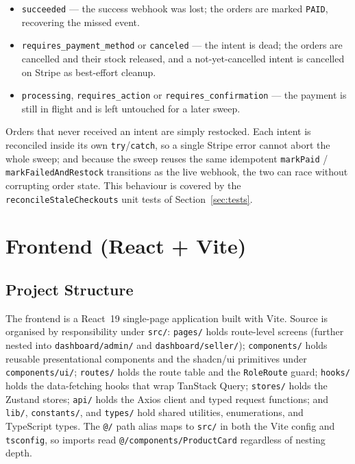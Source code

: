 \documentclass[12pt, a4paper, oneside]{report}
\begin{document}
\begin{itemize}[leftmargin=*,itemsep=2pt]
  \item \texttt{succeeded} --- the success webhook was lost; the orders
        are marked \texttt{PAID}, recovering the missed event.
  \item \texttt{requires\_payment\_method} or \texttt{canceled} --- the
        intent is dead; the orders are cancelled and their stock
        released, and a not-yet-cancelled intent is cancelled on Stripe
        as best-effort cleanup.
  \item \texttt{processing}, \texttt{requires\_action} or
        \texttt{requires\_confirmation} --- the payment is still in
        flight and is left untouched for a later sweep.
\end{itemize}

Orders that never received an intent are simply restocked. Each intent
is reconciled inside its own \texttt{try}/\texttt{catch}, so a single
Stripe error cannot abort the whole sweep; and because the sweep reuses
the same idempotent \texttt{markPaid} / \texttt{markFailedAndRestock}
transitions as the live webhook, the two can race without corrupting
order state. This behaviour is covered by the
\texttt{reconcileStaleCheckouts} unit tests of Section~\ref{sec:tests}.

\section{Frontend (React + Vite)}

\subsection{Project Structure}

The frontend is a React~19 single-page application built with Vite.
Source is organised by responsibility under \texttt{src/}:
\texttt{pages/} holds route-level screens (further nested into
\texttt{dashboard/admin/} and \texttt{dashboard/seller/});
\texttt{components/} holds reusable presentational components and the
shadcn/ui primitives under \texttt{components/ui/}; \texttt{routes/}
holds the route table and the \texttt{RoleRoute} guard;
\texttt{hooks/} holds the data-fetching hooks that wrap TanStack
Query; \texttt{stores/} holds the Zustand stores; \texttt{api/} holds
the Axios client and typed request functions; and \texttt{lib/},
\texttt{constants/}, and \texttt{types/} hold shared utilities,
enumerations, and TypeScript types. The \texttt{@/} path alias maps to
\texttt{src/} in both the Vite config and \texttt{tsconfig}, so imports
read \texttt{@/components/ProductCard} regardless of nesting depth.
\end{document}
